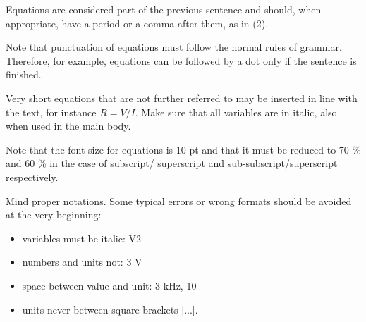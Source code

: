 \documentclass[10pt]{style_src/imeko_acta}
\begin{document}
Equations are considered part of the previous sentence and should, when appropriate, have a period or a comma after them, as in (2).

Note that punctuation of equations must follow the normal rules of grammar. Therefore, for example, equations can be followed by a dot only if the sentence is finished.

Very short equations that are not further referred to may be inserted in line with the text, for instance $R = V/I$. Make sure that all variables are in italic, also when used in the main body. 

Note that the font size for equations is 10 pt and that it must be reduced to 70 \% and 60 \% in the case of subscript/ superscript and sub-subscript/superscript respectively.

Mind proper notations. Some typical errors or wrong formats 
should be avoided at the very beginning: 
\begin{itemize}
	\item variables must be italic: V2
	\item numbers and units not: 3 V
	\item space between value and unit: 3 kHz, 10 %
	\item units never between square brackets [...].
\end{itemize}

\BgThispage
\end{document}
